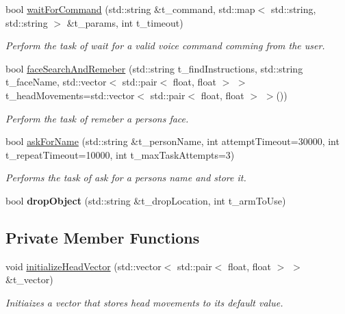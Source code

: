 \begin{DoxyCompactItemize}
bool \hyperlink{class_simple_tasks_ae9e4541c3e71d536b21e24c81f216235}{wait\+For\+Command} (std\+::string \&t\+\_\+command, std\+::map$<$ std\+::string, std\+::string $>$ \&t\+\_\+params, int t\+\_\+timeout)
\begin{DoxyCompactList}\small\item\em Perform the task of wait for a valid voice command comming from the user. \end{DoxyCompactList}\item 
bool \hyperlink{class_simple_tasks_aa62cea5d4153b44aa0f49cee954d8dc6}{face\+Search\+And\+Remeber} (std\+::string t\+\_\+find\+Instructions, std\+::string t\+\_\+face\+Name, std\+::vector$<$ std\+::pair$<$ float, float $>$ $>$ t\+\_\+head\+Movements=std\+::vector$<$ std\+::pair$<$ float, float $>$ $>$())
\begin{DoxyCompactList}\small\item\em Perform the task of remeber a person\textquotesingle{}s face. \end{DoxyCompactList}\item 
bool \hyperlink{class_simple_tasks_a8b8bed28f21c4eb4f823d4a4289a86ee}{ask\+For\+Name} (std\+::string \&t\+\_\+person\+Name, int attempt\+Timeout=30000, int t\+\_\+repeat\+Timeout=10000, int t\+\_\+max\+Task\+Attempts=3)
\begin{DoxyCompactList}\small\item\em Performs the task of ask for a person\textquotesingle{}s name and store it. \end{DoxyCompactList}\item 
bool {\bfseries drop\+Object} (std\+::string \&t\+\_\+drop\+Location, int t\+\_\+arm\+To\+Use)\hypertarget{class_simple_tasks_a54f57a6b6c7c9aeb72d4824b53702fb0}{}\label{class_simple_tasks_a54f57a6b6c7c9aeb72d4824b53702fb0}

\end{DoxyCompactItemize}
\subsection*{Private Member Functions}
\begin{DoxyCompactItemize}
\item 
void \hyperlink{class_simple_tasks_a5997fdb1cc4d696149b5dd2462f253d7}{initialize\+Head\+Vector} (std\+::vector$<$ std\+::pair$<$ float, float $>$ $>$ \&t\+\_\+vector)
\begin{DoxyCompactList}\small\item\em Initiaizes a vector that stores head movements to its default value. \end{DoxyCompactList}\end{DoxyCompactItemize}
